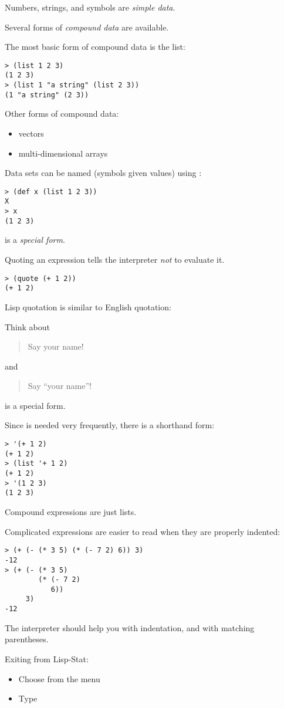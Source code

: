 \begin{slide}{}
Numbers, strings, and symbols are {\em simple data}.

Several forms of {\em compound data} are available.

The most basic form of compound data is the list:
\begin{verbatim}
> (list 1 2 3)
(1 2 3)
> (list 1 "a string" (list 2 3))
(1 "a string" (2 3))
\end{verbatim}
Other forms of compound data:
\begin{itemize}
\item vectors
\item multi-dimensional arrays
\end{itemize}
\end{slide}

\begin{slide}{}
Data sets can be named (symbols given values) using :
\begin{verbatim}
> (def x (list 1 2 3))
X
> x
(1 2 3)
\end{verbatim}
 is a {\em special form}. 
\end{slide}

\begin{slide}{}
Quoting an expression tells the interpreter {\em not} to evaluate it.
\begin{verbatim}
> (quote (+ 1 2))
(+ 1 2)
\end{verbatim}
Lisp quotation is similar to English quotation:

Think about
\begin{quote}
Say your name!
\end{quote}
and
\begin{quote}
Say ``your name''!
\end{quote}
 is a special form.
\end{slide}

\begin{slide}{}
Since  is needed very frequently, there is a shorthand form:
\begin{verbatim}
> '(+ 1 2)
(+ 1 2)
> (list '+ 1 2)
(+ 1 2)
> '(1 2 3)
(1 2 3)
\end{verbatim}
Compound expressions are just lists.
\end{slide}

\begin{slide}{}
Complicated expressions are easier to read when they are properly
indented:
\begin{verbatim}
> (+ (- (* 3 5) (* (- 7 2) 6)) 3)
-12
> (+ (- (* 3 5) 
        (* (- 7 2) 
           6)) 
     3)
-12
\end{verbatim}
The interpreter should help you with indentation, and with matching
parentheses.

Exiting from Lisp-Stat:
\begin{itemize}
\item Choose  from the  menu
\item Type 
\end{itemize}
\end{slide}


